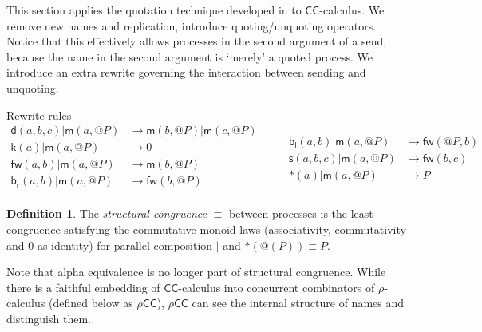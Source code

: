 \documentclass[submission,copyright,creativecommons]{eptcs}
\makeatletter
\newcommand{\ccomb}{$\mathsf{CC}$-calculus}
\newcommand{\pzero}{\mathbin{0}}
\newcommand{\quotep}[1]{\mathsf{@}#1}
\newcommand{\bc}{\mathbin{\mathbf{::=}}}
\newcommand{\bm}{\mathbin{\mathbf\mid}}
\newcommand{\red}{\rightarrow}
\newcommand{\rhoc}{$\rho$-calculus}
\newcommand{\rhocc}{$\rho$$\mathsf{CC}$}
\theoremstyle{definition}
\newtheorem{definition}{Definition}
\theoremstyle{remark}
\theoremstyle{remark}
\makeatother
\begin{document}
This section applies the quotation technique developed in
\cite{DBLP:journals/entcs/MeredithR05} to {\ccomb}. We remove new
names and replication, introduce quoting/unquoting operators. Notice
that this effectively allows processes in the second argument of a
send, because the name in the second argument is `merely' a quoted
process. We introduce an extra rewrite
governing the interaction between sending and unquoting.


\noindent Rewrite rules
\[\begin{array}{rl}
\mathsf{d}(a,b,c) | \mathsf{m}(a,\quotep{P}) & \red \mathsf{m}(b,\quotep{P}) | \mathsf{m}(c,\quotep{P}) \\
\mathsf{k}(a) | \mathsf{m}(a,\quotep{P}) & \red 0 \\
\mathsf{fw}(a,b) | \mathsf{m}(a,\quotep{P}) & \red \mathsf{m}(b,\quotep{P}) \\
\mathsf{b}_{\mathsf{r}}(a,b) | \mathsf{m}(a,\quotep{P}) & \red \mathsf{fw}(b,\quotep{P}) \\  
\end{array} \quad \quad
\begin{array}{rl}
  \mathsf{b}_{\mathsf{l}}(a,b) | \mathsf{m}(a,\quotep{P}) & \red \mathsf{fw}(\quotep{P},b) \\
  \mathsf{s}(a,b,c) | \mathsf{m}(a,\quotep{P}) & \red \mathsf{fw}(b,c) \\
  *(a) | \mathsf{m}(a,\quotep{P}) & \red P
\end{array}\]

\begin{definition}
  The {\em structural congruence} $\equiv$
  between processes \cite{SangiorgiWalker} is the least congruence
  satisfying the commutative monoid laws
  (associativity, commutativity and $\pzero$ as identity) for parallel
  composition $|$ and $*(@(P)) \equiv P$.
\end{definition}

Note that alpha equivalence is no longer part of structural
congruence.  While there is a faithful embedding of {\ccomb} into
concurrent combinators of {\rhoc} (defined below as {\rhocc}),
{\rhocc} can see
the internal structure of names and distinguish them.
\end{document}
